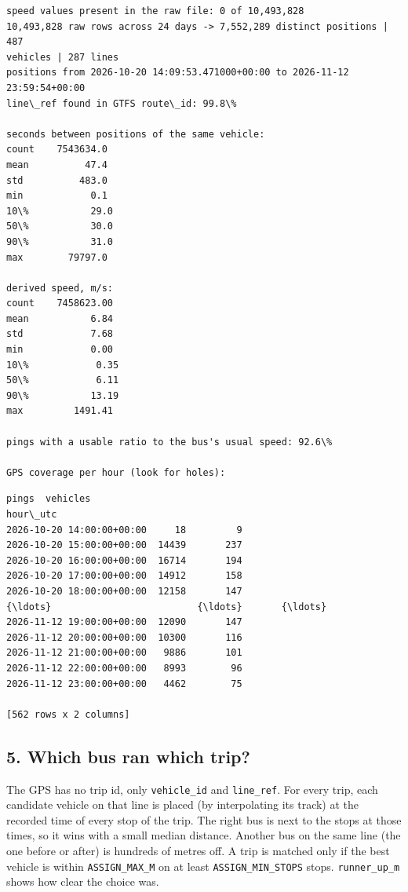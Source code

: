 \documentclass[11pt]{article}
\begin{document}
    \begin{Verbatim}[commandchars=\\\{\}]
speed values present in the raw file: 0 of 10,493,828
10,493,828 raw rows across 24 days -> 7,552,289 distinct positions | 487
vehicles | 287 lines
positions from 2026-10-20 14:09:53.471000+00:00 to 2026-11-12 23:59:54+00:00
line\_ref found in GTFS route\_id: 99.8\%

seconds between positions of the same vehicle:
count    7543634.0
mean          47.4
std          483.0
min            0.1
10\%           29.0
50\%           30.0
90\%           31.0
max        79797.0

derived speed, m/s:
count    7458623.00
mean           6.84
std            7.68
min            0.00
10\%            0.35
50\%            6.11
90\%           13.19
max         1491.41

pings with a usable ratio to the bus's usual speed: 92.6\%

GPS coverage per hour (look for holes):
    \end{Verbatim}

    
    \begin{Verbatim}[commandchars=\\\{\}]
                           pings  vehicles
hour\_utc                                  
2026-10-20 14:00:00+00:00     18         9
2026-10-20 15:00:00+00:00  14439       237
2026-10-20 16:00:00+00:00  16714       194
2026-10-20 17:00:00+00:00  14912       158
2026-10-20 18:00:00+00:00  12158       147
{\ldots}                          {\ldots}       {\ldots}
2026-11-12 19:00:00+00:00  12090       147
2026-11-12 20:00:00+00:00  10300       116
2026-11-12 21:00:00+00:00   9886       101
2026-11-12 22:00:00+00:00   8993        96
2026-11-12 23:00:00+00:00   4462        75

[562 rows x 2 columns]
    \end{Verbatim}

    
    \subsection{5. Which bus ran which
trip?}\label{which-bus-ran-which-trip}

The GPS has no trip id, only \texttt{vehicle\_id} and
\texttt{line\_ref}. For every trip, each candidate vehicle on that line
is placed (by interpolating its track) at the recorded time of every
stop of the trip. The right bus is next to the stops at those times, so
it wins with a small median distance. Another bus on the same line (the
one before or after) is hundreds of metres off. A trip is matched only
if the best vehicle is within \texttt{ASSIGN\_MAX\_M} on at least
\texttt{ASSIGN\_MIN\_STOPS} stops. \texttt{runner\_up\_m} shows how
clear the choice was.
\end{document}
